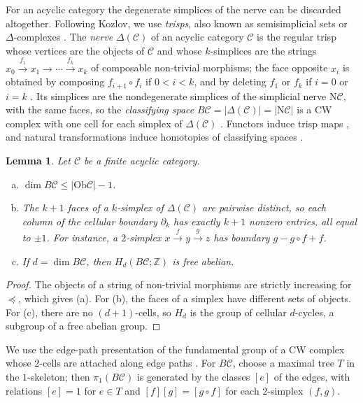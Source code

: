 \documentclass[12pt]{amsart}
\newtheorem{lemma}[teo]{Lemma}
\theoremstyle{definition}
\theoremstyle{remark}
\newcommand{\CC}{\mathcal{C}}
\newcommand{\N}{\mathrm{N}}
\newcommand{\Ob}{\mathrm{Ob}}
\newcommand{\Z}{\mathbb{Z}}
\newcommand{\nerve}{\Delta}
\begin{document}
For an acyclic category the degenerate simplices of the nerve can be discarded altogether. Following Kozlov, we use \emph{trisps}, also known as semisimplicial sets or $\Delta$-complexes \cite[Section~2.3.1, Definition~2.47]{Kozlov2008}. The \emph{nerve} $\nerve(\CC)$ of an acyclic category $\CC$ is the regular trisp whose vertices are the objects of $\CC$ and whose $k$-simplices are the strings $x_0\xrightarrow{f_1}x_1\to\cdots\xrightarrow{f_k}x_k$ of composable non-trivial morphisms; the face opposite $x_i$ is obtained by composing $f_{i+1}\circ f_i$ if $0<i<k$, and by deleting $f_1$ or $f_k$ if $i=0$ or $i=k$ \cite[Definition~10.4]{Kozlov2008}. Its simplices are the nondegenerate simplices of the simplicial nerve $\N\CC$, with the same faces, so the \emph{classifying space} $B\CC=|\nerve(\CC)|=|\N\CC|$ is a CW complex with one cell for each simplex of $\nerve(\CC)$ \cite[Section~10.2.1]{Kozlov2008}. Functors induce trisp maps \cite[Proposition~10.6]{Kozlov2008}, and natural transformations induce homotopies of classifying spaces \cite{Quillen1973}.

\begin{lemma}\label{lem:faces}
Let $\CC$ be a finite acyclic category.
\begin{enumerate}[(a)]
\item $\dim B\CC\le|\Ob\CC|-1$.
\item The $k+1$ faces of a $k$-simplex of $\nerve(\CC)$ are pairwise distinct, so each column of the cellular boundary $\partial_k$ has exactly $k+1$ nonzero entries, all equal to $\pm1$. For instance, a $2$-simplex $x\xrightarrow{f}y\xrightarrow{g}z$ has boundary $g-g\circ f+f$.
\item If $d=\dim B\CC$, then $H_d(B\CC;\Z)$ is free abelian.
\end{enumerate}
\end{lemma}

\begin{proof}
The objects of a string of non-trivial morphisms are strictly increasing for $\preceq$, which gives (a). For (b), the faces of a simplex have different sets of objects. For (c), there are no $(d+1)$-cells, so $H_d$ is the group of cellular $d$-cycles, a subgroup of a free abelian group.
\end{proof}

We use the edge-path presentation of the fundamental group of a CW complex whose $2$-cells are attached along edge paths \cite[Propositions~1.26 and~1A.2]{Hatcher2002}. For $B\CC$, choose a maximal tree $T$ in the $1$-skeleton; then $\pi_1(B\CC)$ is generated by the classes $[e]$ of the edges, with relations $[e]=1$ for $e\in T$ and $[f][g]=[g\circ f]$ for each $2$-simplex $(f,g)$.
\end{document}
